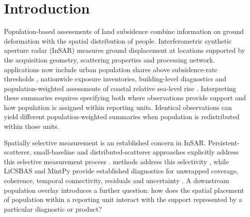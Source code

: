 \documentclass[pdflatex,sn-nature]{sn-jnl}
\providecommand{\DIFadd}[1]{{\protect\color{blue} \sf #1}} %
\providecommand{\DIFdel}[1]{{\protect\color{red} \scriptsize #1}} %
\providecommand{\DIFaddbegin}{} %
\providecommand{\DIFaddend}{} %
\providecommand{\DIFdelbegin}{} %
\providecommand{\DIFdelend}{} %
\begin{document}
\section{Introduction}
\DIFaddbegin \DIFadd{Population-based assessments of land subsidence combine information on ground deformation with the spatial distribution of people. }\DIFaddend Interferometric synthetic aperture radar (InSAR) \DIFdelbegin \DIFdel{measures ground displacement at locations supported by the acquisition geometry, scattering properties and processing network. }\DIFdelend \DIFaddbegin \DIFadd{applications now include urban population shares above subsidence-rate thresholds \citep{ao2024national}, nationwide exposure inventories, building-level diagnostics and population-weighted assessments of coastal relative sea-level rise \citep{xiong2026nationwide,yang2026buildingrisk,oelsmann2026coastal}. Interpreting these summaries requires specifying both where observations provide support and how population is assigned within reporting units. Identical observations can yield different population-weighted summaries when population is redistributed within those units.
}

\DIFadd{Spatially selective measurement is an established concern in InSAR. }\DIFaddend Persistent-scatterer, small-baseline and distributed-scatterer \DIFdelbegin \DIFdel{approaches explicitly address this selective measurement process \citep{ferretti2001ps,berardino2002sbas,ferretti2011squeeSAR}. }\DIFdelend \DIFaddbegin \DIFadd{methods address this selectivity \citep{ferretti2001ps,berardino2002sbas,ferretti2011squeeSAR}, while }\DIFaddend LiCSBAS and MintPy provide \DIFdelbegin \DIFdel{established }\DIFdelend diagnostics for unwrapped coverage, coherence, temporal connectivity, residuals and uncertainty \citep{morishita2020licsbas,yunjun2019mintpy}. \DIFdelbegin \DIFdel{A downstream population overlay introduces a further question: how does the spatial placement of population within a reporting unit interact with the support represented by a particular diagnostic or product?
}%
\end{document}
